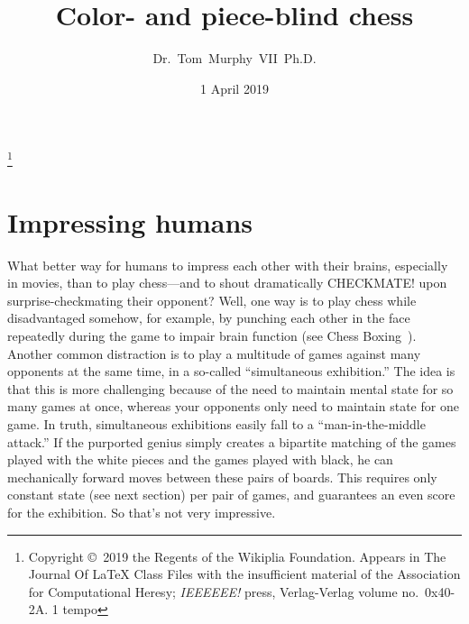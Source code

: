 \documentclass[twocolumn]{amsart}
\begin{document}
 

\title{Color- and piece-blind chess}
\author{Dr.~Tom~Murphy~VII~Ph.D.}\thanks{
Copyright \copyright\ 2019 the Regents of the Wikiplia Foundation.
Appears in The Journal Of LaTeX Class Files with the insufficient
material of the Association for Computational Heresy; {\em IEEEEEE!}
press, Verlag-Verlag volume no.~0x40-2A. 1 tempo}


\newcommand\checkmate{\hspace{-.05em}\raisebox{.4ex}{\tiny\bf ++}}

\renewcommand\th{\ensuremath{{}^{\textrm{th}}}}
\newcommand\st{\ensuremath{{}^{\textrm{st}}}}
\newcommand\rd{\ensuremath{{}^{\textrm{rd}}}}
\newcommand\nd{\ensuremath{{}^{\textrm{nd}}}}
\newcommand\at{\ensuremath{\scriptstyle @}}

\date{1 April 2019}

\maketitle \thispagestyle{empty}


\section{Impressing humans}

What better way for humans to impress each other with their brains,
especially in movies, than to play chess---and to shout dramatically
CHECKMATE! upon surprise-checkmating their opponent? Well, one way is
to play chess while disadvantaged somehow, for example, by punching
each other in the face repeatedly during the game to impair brain
function (see Chess Boxing~\cite{chessboxing}). Another common
distraction is to play a multitude of games against many opponents at
the same time, in a so-called ``simultaneous exhibition.'' The idea is
that this is more challenging because of the need to maintain mental
state for so many games at once, whereas your opponents only need to
maintain state for one game. In truth, simultaneous exhibitions easily
fall to a ``man-in-the-middle attack.'' If the purported genius simply
creates a bipartite matching of the games played with the white pieces
and the games played with black, he can mechanically forward moves
between these pairs of boards. This requires only constant state (see
next section) per pair of games, and guarantees an even score for the
exhibition. So that's not very impressive.
\end{document}

